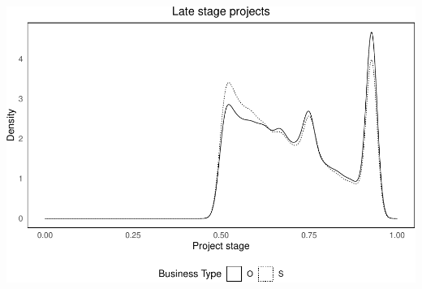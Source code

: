 \documentclass[
]{article}
\begin{document}
\includegraphics{qp_first_pc_delay-2_files/figure-latex/stage_plots_tercile_3-1.pdf}
\end{document}
